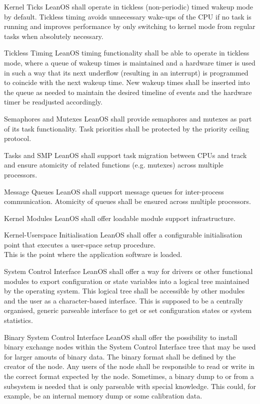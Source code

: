  {Kernel Ticks}{%
LeanOS shall operate in tickless (non-periodic) timed wakeup mode by default.
}{%
Tickless timing avoids unnecessary wake-ups of the CPU if no task is running
and improves performance by only switching to kernel mode from regular tasks
when absolutely necessary.
}%

 {Tickless Timing}{%
LeanOS timing functionality shall be able to operate in tickless mode, where 
a queue of wakeup times is maintained and a hardware timer is used in such a way
that its next underflow (resulting in an interrupt) is programmed to coincide
with the next wakeup time. New wakeup times shall be inserted into the queue as
needed to maintain the desired timeline of events and the hardware timer
be readjusted accordingly.
}{}%

 {Semaphores and Mutexes}{%
LeanOS shall provide semaphores and mutexes as part of its task functionality.
Task priorities shall be protected by the priority ceiling protocol.
}{}%

 {Tasks and \gls{SMP}}{%
LeanOS shall support task migration between \glspl{CPU} and track and ensure
atomicity of related functions (e.g. mutexes) across multiple processors.
}{}%

 {Message Queues}{%
LeanOS shall support message queues for inter-process communication.
Atomicity of queues shall be ensured across multiple processors.
}{}%

 {Kernel Modules}{%
LeanOS shall offer loadable module support infrastructure.
}{}%

 {Kernel-Userspace Initialisation}{%
LeanOS shall offer a configurable initialisation point that executes a
user-space setup procedure.\\


}{%
This is the point where the application software is loaded.%
}%

 {System Control Interface}{%
LeanOS shall offer a way for drivers or other functional modules to export
configuration or state variables into a logical tree maintained by
the operating system. This logical tree shall be accessible by other modules and
the user as a character-based interface.
}{%
This is supposed to be a centrally organised, generic parseable interface to
get or set configuration states or system statistics.
}%

 {Binary System Control Interface}{%
LeanOS shall offer the possibility to install binary exchange nodes within the
System Control Interface tree that may be used for larger amouts of binary data.
The binary format shall be defined by the creator of the node. Any users of the
node shall be responsible to read or write in the correct format expected by the
node.%
}{%
Sometimes, a binary dump to or from a subsystem is needed that is only parseable
with special knowledge. This could, for example, be an internal memory dump or
some calibration data.
}%


